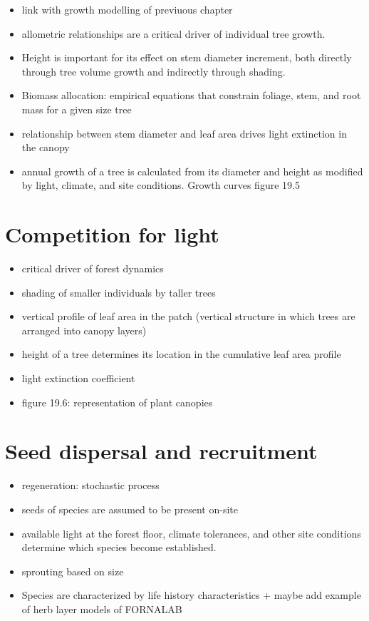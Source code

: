 \documentclass[12pt,oneside]{book}
\providecommand{\tightlist}{%
  \setlength{\itemsep}{0pt}\setlength{\parskip}{0pt}}
\begin{document}
\begin{itemize}
\tightlist
\item
  link with growth modelling of previuous chapter
\item
  allometric relationships are a critical driver of individual tree
  growth.
\item
  Height is important for its effect on stem diameter increment, both
  directly through tree volume growth and indirectly through shading.
\item
  Biomass allocation: empirical equations that constrain foliage, stem,
  and root mass for a given size tree
\item
  relationship between stem diameter and leaf area drives light
  extinction in the canopy
\item
  annual growth of a tree is calculated from its diameter and height as
  modified by light, climate, and site conditions. Growth curves figure
  19.5
\end{itemize}

\section{Competition for light}\label{competition-for-light}

\begin{itemize}
\tightlist
\item
  critical driver of forest dynamics
\item
  shading of smaller individuals by taller trees
\item
  vertical profile of leaf area in the patch (vertical structure in
  which trees are arranged into canopy layers)
\item
  height of a tree determines its location in the cumulative leaf area
  profile
\item
  light extinction coefficient
\item
  figure 19.6: representation of plant canopies
\end{itemize}

\section{Seed dispersal and
recruitment}\label{seed-dispersal-and-recruitment}

\begin{itemize}
\item
  regeneration: stochastic process
\item
  seeds of species are assumed to be present on-site
\item
  available light at the forest floor, climate tolerances, and other
  site conditions determine which species become established.
\item
  sprouting based on size
\item
  Species are characterized by life history characteristics + maybe add
  example of herb layer models of FORNALAB
\end{itemize}
\end{document}
